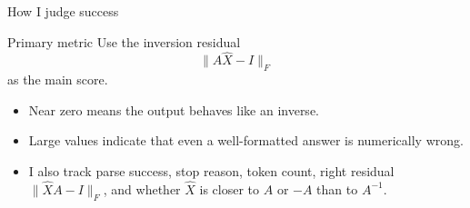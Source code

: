 \documentclass[aspectratio=169,professionalfonts]{beamer}
\begin{document}
\begin{frame}{How I judge success}
\begin{block}{Primary metric}
Use the inversion residual
\[
\|A\hat{X} - I\|_F
\]
as the main score.
\end{block}

\begin{itemize}[itemsep=0.6em]
    \item Near zero means the output behaves like an inverse.
    \item Large values indicate that even a well-formatted answer is numerically wrong.
    \item I also track parse success, stop reason, token count, right residual $\|\hat{X}A-I\|_F$, and whether $\hat{X}$ is closer to $A$ or $-A$ than to $A^{-1}$.
\end{itemize}
\end{frame}
\end{document}
